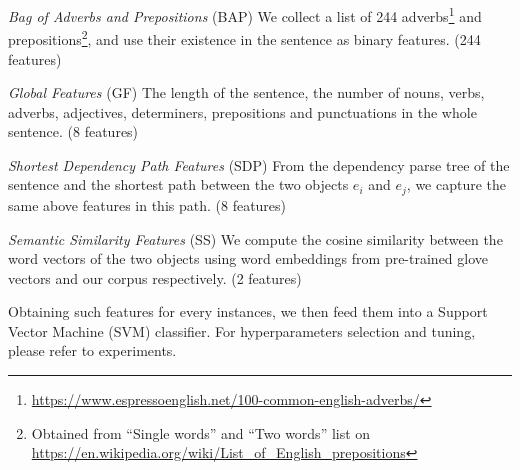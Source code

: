 \noindent
\textit{Bag of Adverbs and Prepositions} (BAP)
We collect a list of 244 adverbs\footnote{\url{https://www.espressoenglish.net/100-common-english-adverbs/}} and prepositions\footnote{Obtained from ``Single words'' and ``Two words'' list on \url{https://en.wikipedia.org/wiki/List_of_English_prepositions}}, 
and use their existence in the sentence as binary features. (244 features)

\noindent
\textit{Global Features} (GF)
The length of the sentence, the number of nouns, verbs, adverbs, adjectives, determiners, prepositions and punctuations in the whole sentence. (8 features)

\noindent
\textit{Shortest Dependency Path Features} (SDP)
From the dependency parse
tree of the sentence and the shortest path between the two objects 
$e_i$ and $e_j$, we capture the same above features in this path. (8 features)

\noindent
\textit{Semantic Similarity Features} (SS)
We compute the cosine similarity between the word vectors of the two objects using word embeddings from pre-trained glove vectors and our corpus respectively. (2 features)

Obtaining such features for every instances, 
we then feed them into a Support Vector Machine (SVM) classifier. 
For hyperparameters selection and tuning, please refer 
to experiments. 

